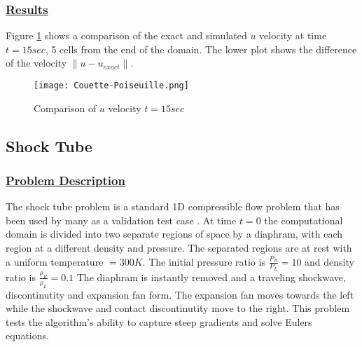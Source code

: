 \subsubsection*{\underline{Results}}
Figure \ref{fig:CombinedPoiseuille} shows a comparison of the exact and simulated $u$ velocity at time $t = 15sec$, 5 cells from the end of the domain.  The lower plot shows the difference of the velocity $\|u - u_{exact}\|$.
%
\begin{figure}
  \texttt{[image: Couette-Poiseuille.png]}
  \vspace{-20pt}
  \caption{ Comparison of $u$ velocity $t = 15sec$}
  \label{fig:CombinedPoiseuille}
  \end{figure}
\newpage
%
\subsection*{\center Shock Tube}
%
%
\subsubsection*{\underline{Problem Description}}
%
The shock tube problem is a standard 1D compressible flow problem that has been used by many as a validation test case \cite{ref:laney, ref:sod, ref:toro}. At time $t=0$ the computational domain is divided into two separate regions of space by a diaphram, with each region at a different density and pressure.  The separated regions are at rest with a uniform temperature $=300K$.  The initial pressure ratio is $\frac{P_R}{P_L}  = 10$ and density ratio is $\frac{\rho_R}{\rho_L} = 0.1$  The diaphram is instantly removed and a traveling shockwave, discontinutity and expansion fan form.  The expansion fan moves towards the left while the shockwave and contact discontinutity move to the right.  This problem tests the algorithm's ability to capture steep gradients and solve Eulers equations.
%
